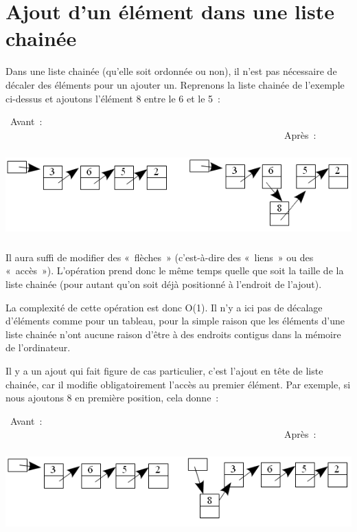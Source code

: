 \section{Ajout d'un élément dans une liste chainée}

	Dans une liste chainée (qu'elle soit ordonnée ou non), 
	il n'est pas nécessaire de décaler des éléments pour un ajouter
	un. Reprenons la liste chainée de l'exemple ci-dessus 
	et ajoutons l'élément 8 entre le 6 et le 5~:

	\ Avant~: \ \ \ \ \ \ \ \ \ \ \ \ \ \ \ \ \ \ \ \ \ \ \ \ \ \ \ \ \ \ \ \ \ \ \ \ \ \ \ \ \ \ \ \ \ \ \ \ \ \ \ \ \ \ \ \ \ \ Après~:

	 \includegraphics[width=15.558cm,height=3.334cm]{image/a2012Logique2eme-img004.png} 

	Il aura suffi de modifier des «~flèches~» (c'est-à-dire des «~liens~» 
	ou des «~accès~»). L'opération prend donc le même
	temps quelle que soit la taille de la liste chainée 
	(pour autant qu'on soit déjà positionné à l'endroit de l'ajout).

	La complexité de cette opération est donc O(1). Il n'y a ici pas de décalage d'éléments comme pour un tableau, pour la
	simple raison que les éléments d'une liste chainée n'ont aucune raison d'être à des endroits contigus dans la mémoire
	de l'ordinateur.

	Il y a un ajout qui fait figure de cas particulier, c'est l'ajout en tête de liste chainée, car il modifie
	obligatoirement l'accès au premier élément. Par exemple, si nous ajoutons 8 en première position, cela donne~:

	\ Avant~: \ \ \ \ \ \ \ \ \ \ \ \ \ \ \ \ \ \ \ \ \ \ \ \ \ \ \ \ \ \ \ \ \ \ \ \ \ \ \ \ \ \ \ \ \ \ \ \ \ \ \ \ \ \ \ \ \ \ Après~:

	 \includegraphics[width=15.452cm,height=3.122cm]{image/a2012Logique2eme-img005.png}
	
